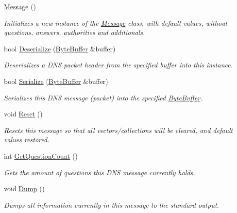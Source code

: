 \begin{DoxyCompactItemize}
\item 
\hyperlink{class_senergy_1_1_dns_1_1_message_a3e7192f2293903a43e7d08960b08a8b1}{Message} ()
\begin{DoxyCompactList}\small\item\em Initializes a new instance of the \hyperlink{class_senergy_1_1_dns_1_1_message}{Message} class, with default values, without questions, answers, authorities and additionals. \end{DoxyCompactList}\item 
bool \hyperlink{class_senergy_1_1_dns_1_1_message_a3857764a799ab123405420345f9b03ee}{Deserialize} (\hyperlink{class_senergy_1_1_byte_buffer}{Byte\-Buffer} \&buffer)
\begin{DoxyCompactList}\small\item\em Deserializes a D\-N\-S packet header from the specified buffer into this instance. \end{DoxyCompactList}\item 
bool \hyperlink{class_senergy_1_1_dns_1_1_message_a2e7978e799fadaa4f03fc881e5c8e0f6}{Serialize} (\hyperlink{class_senergy_1_1_byte_buffer}{Byte\-Buffer} \&buffer)
\begin{DoxyCompactList}\small\item\em Serializes this D\-N\-S message (packet) into the specified \hyperlink{class_senergy_1_1_byte_buffer}{Byte\-Buffer}. \end{DoxyCompactList}\item 
void \hyperlink{class_senergy_1_1_dns_1_1_message_a60d242fef8b20993f9cd9b4591453e1b}{Reset} ()
\begin{DoxyCompactList}\small\item\em Resets this message so that all vectors/collections will be cleared, and default values restored. \end{DoxyCompactList}\item 
int \hyperlink{class_senergy_1_1_dns_1_1_message_a5d5219532098cf60e2395764e7f61aca}{Get\-Question\-Count} ()
\begin{DoxyCompactList}\small\item\em Gets the amount of questions this D\-N\-S message currently holds. \end{DoxyCompactList}\item 
void \hyperlink{class_senergy_1_1_dns_1_1_message_ab4ce784232a2b68d7fe27512913447a0}{Dump} ()
\begin{DoxyCompactList}\small\item\em Dumps all information currently in this message to the standard output. \end{DoxyCompactList}\end{DoxyCompactItemize}
